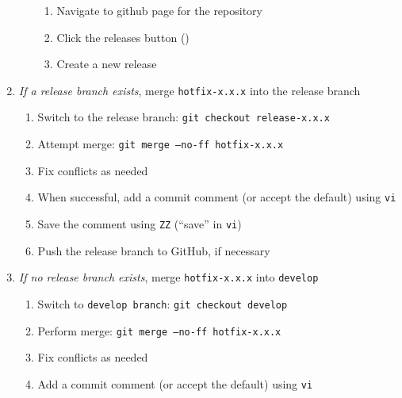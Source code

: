 \documentclass{article}
\begin{document}
\begin{enumerate}
\begin{enumerate}
\begin{enumerate}
	  \item Navigate to github page for the repository

	  \item Click the releases button ()

	  \item Create a new release

	\end{enumerate}
  \end{enumerate}

  \item \emph{If a release branch exists},
  		merge \texttt{hotfix-x.x.x} into the release branch
  \begin{enumerate}

    \item Switch to the release branch: \texttt{git checkout release-x.x.x}

    \item Attempt merge: \texttt{git merge --no-ff hotfix-x.x.x}

	\item Fix conflicts as needed

	\item When successful, add a commit comment (or accept the default) using \texttt{vi}

	\item Save the comment using \texttt{ZZ} (``save'' in \texttt{vi})

	\item Push the release branch to GitHub, if necessary

  \end{enumerate}
  \item \emph{If no release branch exists}, merge \texttt{hotfix-x.x.x} into \texttt{develop}
  \begin{enumerate}

    \item Switch to \texttt{develop branch}: \texttt{git checkout develop}

    \item Perform merge: \texttt{git merge --no-ff hotfix-x.x.x}

	\item Fix conflicts as needed

	\item Add a commit comment (or accept the default) using \texttt{vi}


\end{enumerate}
\end{enumerate}
\end{document}
